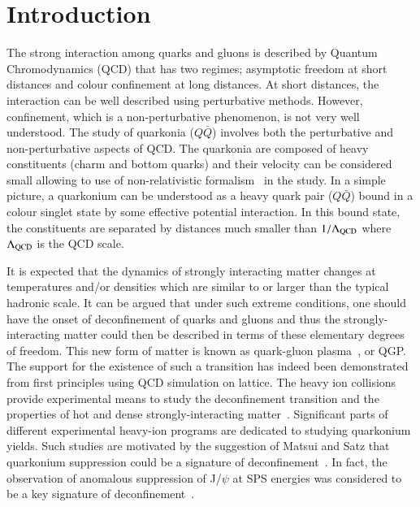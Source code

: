 \newpage
\section{Introduction}
\label{sec:Introduction}


The strong interaction among quarks and gluons is described by
Quantum Chromodynamics (QCD) that has two regimes; asymptotic freedom at short
distances and colour confinement at long distances.
At short distances, the interaction can be well described using perturbative methods. 
However, confinement, which is a non-perturbative phenomenon, is not 
very well understood. The study of quarkonia ($Q\bar{Q}$) involves
both the perturbative and non-perturbative aspects of QCD. 
The quarkonia are composed of heavy constituents (charm and bottom quarks) and their
velocity can be considered small allowing to use of non-relativistic
formalism~\cite{Povh:1995mua,Ikhdair:2005jf} in the study. 
In a simple picture,  a quarkonium can be understood as a heavy quark pair ($Q\bar{Q}$)
bound in a colour singlet state by some effective potential interaction.
In this bound state, the constituents are separated by distances much smaller
than $1/\Lambda_{\rm QCD}$ where $\Lambda_{\rm QCD}$ is the QCD scale.

It is expected that the dynamics of strongly interacting matter changes
at temperatures and/or densities which are similar to or larger than
the typical hadronic scale.
It can be argued that under such extreme conditions, 
one should have the onset of deconfinement of quarks and gluons  and thus the 
strongly-interacting matter could then be described in terms of these
elementary degrees of freedom.
This new form of matter is known as 
quark-gluon plasma~\cite{Shuryak:1980tp,Satz:2011wf}, or QGP.
The support for the existence of such a transition has indeed been demonstrated 
from first principles using QCD simulation on lattice.
The heavy ion collisions provide experimental means to study the deconfinement transition 
and the properties of hot and dense strongly-interacting matter~\cite{Satz:2000bn}.
Significant parts of different experimental heavy-ion programs are dedicated to studying
quarkonium yields. Such studies are 
motivated by the suggestion of  Matsui and Satz
that quarkonium suppression could be a signature of 
deconfinement~\cite{Matsui:1986dk}.
In fact, the observation of anomalous suppression of J/$\psi$ at SPS energies
was considered to be a key signature of deconfinement~\cite{Kluberg:2005yh}.


